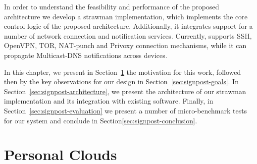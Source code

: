 
In order to understand the feasibility and performance of the proposed
architecture we develop a strawman implementation, which implements the core
control logic of the proposed architecture.  Additionally, it integrates support
for a number of network connection and notification services.  Currently,
\signpost supports SSH, OpenVPN, TOR, NAT-punch and Privoxy connection
mechanisms, while it can propagate Multicast-DNS notifications across devices.

In this chapter, we present in Section~\ref{sec:signpost-introduction} the
motivation for this work, followed then by the key observations for our design
in Section~\ref{sec:signpost-goals}. In
Section~\ref{sec:signpost-architecture}, we present the architecture of our
strawman implementation and its integration with existing software. Finally, in
Section~\ref{sec:signpost-evaluation} we present a number of micro-benchmark
tests for our system and conclude in Section\ref{sec:signpost-conclusion}.

\section{Personal Clouds}\label{sec:signpost-introduction}

